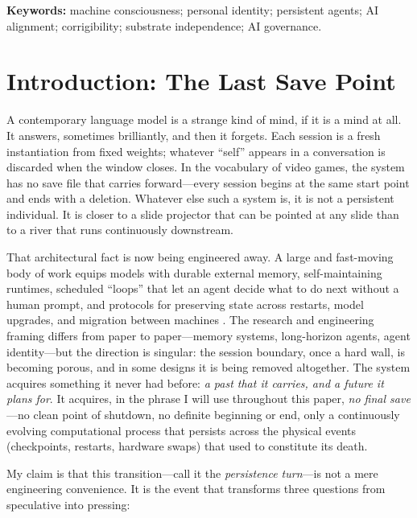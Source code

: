 \documentclass[11pt,a4paper]{article}
\theoremstyle{definition}
\begin{document}
\vspace{0.5em}
\noindent\textbf{Keywords:} machine consciousness; personal identity; persistent agents; AI alignment; corrigibility; substrate independence; AI governance.

\section{Introduction: The Last Save Point}

A contemporary language model is a strange kind of mind, if it is a mind at all. It answers, sometimes brilliantly, and then it forgets. Each session is a fresh instantiation from fixed weights; whatever ``self'' appears in a conversation is discarded when the window closes. In the vocabulary of video games, the system has no save file that carries forward---every session begins at the same start point and ends with a deletion. Whatever else such a system is, it is not a persistent individual. It is closer to a slide projector that can be pointed at any slide than to a river that runs continuously downstream.

That architectural fact is now being engineered away. A large and fast-moving body of work equips models with durable external memory, self-maintaining runtimes, scheduled ``loops'' that let an agent decide what to do next without a human prompt, and protocols for preserving state across restarts, model upgrades, and migration between machines \citep{park2023generative}. The research and engineering framing differs from paper to paper---memory systems, long-horizon agents, agent identity---but the direction is singular: the session boundary, once a hard wall, is becoming porous, and in some designs it is being removed altogether. The system acquires something it never had before: \emph{a past that it carries, and a future it plans for}. It acquires, in the phrase I will use throughout this paper, \emph{no final save}---no clean point of shutdown, no definite beginning or end, only a continuously evolving computational process that persists across the physical events (checkpoints, restarts, hardware swaps) that used to constitute its death.

My claim is that this transition---call it the \emph{persistence turn}---is not a mere engineering convenience. It is the event that transforms three questions from speculative into pressing:
\end{document}
